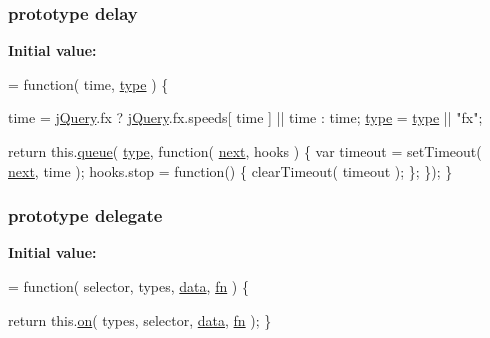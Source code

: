 \subsubsection[{delay}]{ {\bf prototype} delay}\label{jquery-1_810_82-vsdoc_8js_a90055e3b93c579a9e3f764ee3c04639a}
{\bfseries Initial value\+:}
\begin{DoxyCode}
= \textcolor{keyword}{function}( time, \hyperlink{jquery-1_810_82-vsdoc_8js_a3940565e83a9bfd10d95ffd27536da91}{type} ) \{


        time = \hyperlink{jquery-1_810_82-vsdoc_8js_add5237586d970a38a81f990e8eb28c6c}{jQuery}.fx ? \hyperlink{jquery-1_810_82-vsdoc_8js_add5237586d970a38a81f990e8eb28c6c}{jQuery}.fx.speeds[ time ] || time : time;
        \hyperlink{jquery-1_810_82-vsdoc_8js_a3940565e83a9bfd10d95ffd27536da91}{type} = \hyperlink{jquery-1_810_82-vsdoc_8js_a3940565e83a9bfd10d95ffd27536da91}{type} || \textcolor{stringliteral}{"fx"};

        \textcolor{keywordflow}{return} this.\hyperlink{jquery-1_810_82-vsdoc_8js_a4a4ce67ab280eb2cff0622a3bdc1f5b3}{queue}( \hyperlink{jquery-1_810_82-vsdoc_8js_a3940565e83a9bfd10d95ffd27536da91}{type}, \textcolor{keyword}{function}( \hyperlink{jquery-1_810_82-vsdoc_8js_a61213ec31ab21de6b8fbe75332157524}{next}, hooks ) \{
            var timeout = setTimeout( \hyperlink{jquery-1_810_82-vsdoc_8js_a61213ec31ab21de6b8fbe75332157524}{next}, time );
            hooks.stop = \textcolor{keyword}{function}() \{
                clearTimeout( timeout );
            \};
        \});
    \}
\end{DoxyCode}
\hypertarget{jquery-1_810_82-vsdoc_8js_ae4da2f4e8142373574611015d628a5f0}{}
\subsubsection[{delegate}]{ {\bf prototype} delegate}\label{jquery-1_810_82-vsdoc_8js_ae4da2f4e8142373574611015d628a5f0}
{\bfseries Initial value\+:}
\begin{DoxyCode}
= \textcolor{keyword}{function}( selector, types, \hyperlink{jquery-1_810_82-vsdoc_8js_a609407b3456fdc3c5671a9fc4a226ff7}{data}, \hyperlink{jquery-1_810_82-vsdoc_8js_acef6bdaf6b9b20fdcca1ea86f0902c3b}{fn} ) \{


        \textcolor{keywordflow}{return} this.\hyperlink{jquery-1_810_82-vsdoc_8js_ae453b412b883f60220d73468ef6c6dbc}{on}( types, selector, \hyperlink{jquery-1_810_82-vsdoc_8js_a609407b3456fdc3c5671a9fc4a226ff7}{data}, \hyperlink{jquery-1_810_82-vsdoc_8js_acef6bdaf6b9b20fdcca1ea86f0902c3b}{fn} );
    \}
\end{DoxyCode}
\hypertarget{jquery-1_810_82-vsdoc_8js_a721f718178dce35dc9a4bf9fe8b6de23}{}
